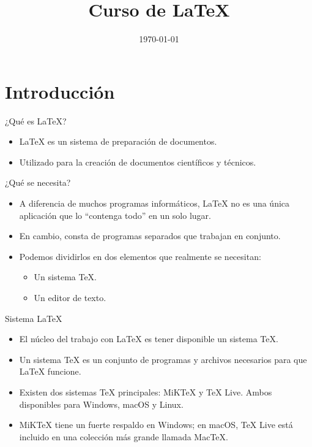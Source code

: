 \documentclass[12pt]{beamer}
\title{Curso de \LaTeX}
\date{\today}
\begin{document}
\begin{frame}
\titlepage
\end{frame}
\begin{frame}
\tableofcontents
\end{frame}
\section{Introducción}
\begin{frame}{¿Qué es \LaTeX?}
  \begin{itemize}
    \item \LaTeX{} es un sistema de preparación de documentos.
    \item<2-> Utilizado para la creación de documentos científicos y técnicos.
  \end{itemize}
\end{frame}
\begin{frame}{¿Qué se necesita?}
  \begin{itemize}
    \item A diferencia de muchos programas informáticos, \LaTeX{} no es una única aplicación que lo ``contenga todo'' en un solo lugar.
    \item<2-> En cambio, consta de programas separados que trabajan en conjunto.
    \item<3-> Podemos dividirlos en dos elementos que realmente se necesitan:
    \begin{itemize}
      \item<4-> Un sistema TeX.
      \item<5-> Un editor de texto.
    \end{itemize}
  \end{itemize}  
\end{frame}
\begin{frame}{Sistema \LaTeX}
  \begin{itemize}
    \item<1-> El núcleo del trabajo con \LaTeX{} es tener disponible un sistema TeX. 
    \item<2-> Un sistema TeX es un conjunto de programas y archivos necesarios para que \LaTeX{} funcione.
    \item<3-> Existen dos sistemas TeX principales: MiKTeX y TeX Live. Ambos disponibles para Windows, macOS y Linux.
    \item<4-> MiKTeX tiene un fuerte respaldo en Windows; en macOS, TeX Live está incluido en una colección más grande llamada MacTeX.
  \end{itemize}
\end{frame}
\end{document}
